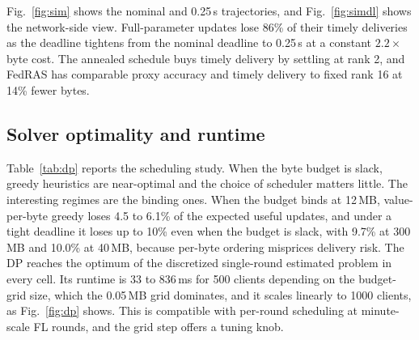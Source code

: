 \documentclass[preprint,12pt]{elsarticle}
\begin{document}
Fig.~\ref{fig:sim} shows the nominal and 0.25\,s trajectories, and Fig.~\ref{fig:simdl} shows the network-side view. Full-parameter updates lose 86\% of their timely deliveries as the deadline tightens from the nominal deadline to 0.25\,s at a constant $2.2\times$ byte cost. The annealed schedule buys timely delivery by settling at rank 2, and FedRAS has comparable proxy accuracy and timely delivery to fixed rank 16 at 14\% fewer bytes.

\begin{table}[H]
\centering
\caption{Solver study with 500 clients, $K{=}25$, and 30 instances per cell. The table reports heuristic loss relative to the grid-based DP and DP runtime.}
\label{tab:dp}
\end{table}

\subsection{Solver optimality and runtime}
\label{sec:dp_study}
Table~\ref{tab:dp} reports the scheduling study. When the byte budget is slack, greedy heuristics are near-optimal and the choice of scheduler matters little. The interesting regimes are the binding ones. When the budget binds at 12\,MB, value-per-byte greedy loses 4.5 to 6.1\% of the expected useful updates, and under a tight deadline it loses up to 10\% even when the budget is slack, with 9.7\% at 300\,MB and 10.0\% at 40\,MB, because per-byte ordering misprices delivery risk. The DP reaches the optimum of the discretized single-round estimated problem in every cell. Its runtime is 33 to 836\,ms for 500 clients depending on the budget-grid size, which the 0.05\,MB grid dominates, and it scales linearly to 1000 clients, as Fig.~\ref{fig:dp} shows. This is compatible with per-round scheduling at minute-scale FL rounds, and the grid step offers a tuning knob.
\end{document}
